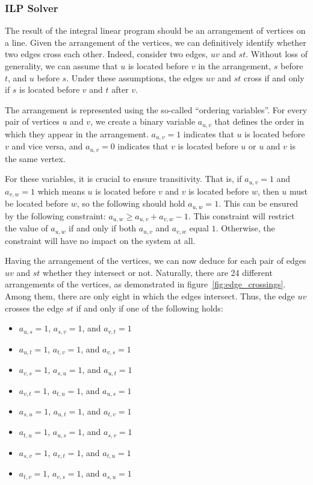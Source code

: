 \documentclass{article}
\begin{document}
    \subsubsection{ILP Solver}\label{subsubsec:ILP-def}

    The result of the integral linear program should be an arrangement of vertices on a line.
    Given the arrangement of the vertices, we can definitively identify whether two edges cross each other.
    Indeed, consider two edges, $uv$ and $st$.
    Without loss of generality, we can assume that $u$ is located before $v$ in the arrangement, $s$ before $t$, and $u$ before $s$.
    Under these assumptions, the edges $uv$ and $st$ cross if and only if $s$ is located before $v$ and $t$ after $v$.

    The arrangement is represented using the so-called ``ordering variables''.
    For every pair of vertices $u$ and $v$, we create a binary variable $a_{u, v}$ that defines the order in which they appear in the arrangement.
    $a_{u, v} = 1$ indicates that $u$ is located before $v$ and vice versa, and $a_{u, v} = 0$ indicates that $v$ is located before $u$ or $u$ and $v$ is the same vertex.

    For these variables, it is crucial to ensure transitivity.
    That is, if $a_{u, v} = 1$ and $a_{v, w} = 1$ which means $u$ is located before $v$ and $v$ is located before $w$, then $u$ must be located before $w$, so the following should hold $a_{u, w} = 1$.
    This can be ensured by the following constraint: $a_{u, w} \geqslant a_{u, v} + a_{v, w} - 1$.
    This constraint will restrict the value of $a_{u, w}$ if and only if both $a_{u, v}$ and $a_{v, w}$ equal $1$.
    Otherwise, the constraint will have no impact on the system at all.

    Having the arrangement of the vertices, we can now deduce for each pair of edges $uv$ and $st$ whether they intersect or not.
    Naturally, there are 24 different arrangements of the vertices, as demonstrated in figure~\ref{fig:edge_crossings}.
    Among them, there are only eight in which the edges intersect.
    Thus, the edge $uv$ crosses the edge $st$ if and only if one of the following holds:
    \begin{itemize}[noitemsep]
        \item $a_{u,s} = 1$, $a_{s,v} = 1$, and $a_{v,t} = 1$
        \item $a_{u,t} = 1$, $a_{t,v} = 1$, and $a_{v,s} = 1$
        \item $a_{v,s} = 1$, $a_{s,u} = 1$, and $a_{u,t} = 1$
        \item $a_{v,t} = 1$, $a_{t,u} = 1$, and $a_{u,s} = 1$
        \item $a_{s,u} = 1$, $a_{u,t} = 1$, and $a_{t,v} = 1$
        \item $a_{t,u} = 1$, $a_{u,s} = 1$, and $a_{s,v} = 1$
        \item $a_{s,v} = 1$, $a_{v,t} = 1$, and $a_{t,u} = 1$
        \item $a_{t,v} = 1$, $a_{v,s} = 1$, and $a_{s,u} = 1$
    \end{itemize}
\end{document}
